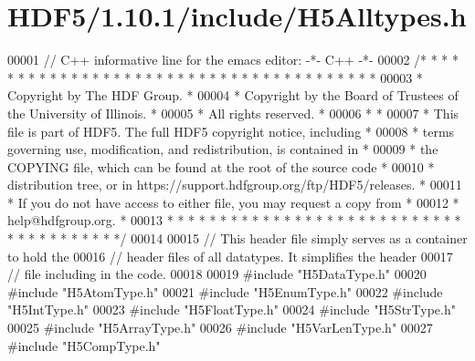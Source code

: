 \hypertarget{_h_d_f5_21_810_81_2include_2_h5_alltypes_8h_source}{}\section{H\+D\+F5/1.10.1/include/\+H5\+Alltypes.h}
\label{_h_d_f5_21_810_81_2include_2_h5_alltypes_8h_source}

\begin{DoxyCode}
00001 \textcolor{comment}{// C++ informative line for the emacs editor: -*- C++ -*-}
00002 \textcolor{comment}{/* * * * * * * * * * * * * * * * * * * * * * * * * * * * * * * * * * * * * * *}
00003 \textcolor{comment}{ * Copyright by The HDF Group.                                               *}
00004 \textcolor{comment}{ * Copyright by the Board of Trustees of the University of Illinois.         *}
00005 \textcolor{comment}{ * All rights reserved.                                                      *}
00006 \textcolor{comment}{ *                                                                           *}
00007 \textcolor{comment}{ * This file is part of HDF5.  The full HDF5 copyright notice, including     *}
00008 \textcolor{comment}{ * terms governing use, modification, and redistribution, is contained in    *}
00009 \textcolor{comment}{ * the COPYING file, which can be found at the root of the source code       *}
00010 \textcolor{comment}{ * distribution tree, or in https://support.hdfgroup.org/ftp/HDF5/releases.  *}
00011 \textcolor{comment}{ * If you do not have access to either file, you may request a copy from     *}
00012 \textcolor{comment}{ * help@hdfgroup.org.                                                        *}
00013 \textcolor{comment}{ * * * * * * * * * * * * * * * * * * * * * * * * * * * * * * * * * * * * * * */}
00014 
00015 \textcolor{comment}{// This header file simply serves as a container to hold the}
00016 \textcolor{comment}{// header files of all datatypes.  It simplifies the header}
00017 \textcolor{comment}{// file including in the code.}
00018 
00019 \textcolor{preprocessor}{#include "H5DataType.h"}
00020 \textcolor{preprocessor}{#include "H5AtomType.h"}
00021 \textcolor{preprocessor}{#include "H5EnumType.h"}
00022 \textcolor{preprocessor}{#include "H5IntType.h"}
00023 \textcolor{preprocessor}{#include "H5FloatType.h"}
00024 \textcolor{preprocessor}{#include "H5StrType.h"}
00025 \textcolor{preprocessor}{#include "H5ArrayType.h"}
00026 \textcolor{preprocessor}{#include "H5VarLenType.h"}
00027 \textcolor{preprocessor}{#include "H5CompType.h"}
\end{DoxyCode}
